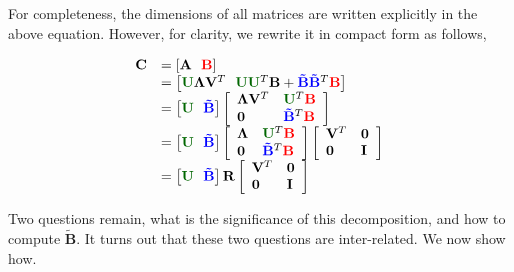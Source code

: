 For completeness, the dimensions of all matrices are written explicitly in the above equation.  However, for clarity, we rewrite it in compact form as follows,

\begin{equation}
\begin{array}{llll}
\mathbf{C} &= \left[{\mathbf{A}} \ \ {\color{red}{\color{red}\mathbf{B}}}\right]\\
&= \left[{\color{darkgreen}\mathbf{U}}\mathbf{\Lambda}\mathbf{V}^T \ \ {\color{darkgreen}\mathbf{U}}{\color{darkgreen}\mathbf{U}}^T\mathbf{B} + {\color{blue}\mathbf{\tilde{B}}} {{\color{blue}\mathbf{\tilde{B}}}^T}{\color{red}{\color{red}\mathbf{B}}}\right]\\
&= \left[{\color{darkgreen}\mathbf{U}} \ \ {\color{blue}\mathbf{\tilde{B}}}\right]\left[\begin{array}{llll}\mathbf{\Lambda}\mathbf{V}^T &{\color{darkgreen}\mathbf{U}}^T{\color{red}{\color{red}\mathbf{B}}}\\ \mathbf{0} & {\color{blue}\mathbf{\tilde{B}}}^T{\color{red}{\color{red}\mathbf{B}}}\end{array}\right]\\
&= \left[{\color{darkgreen}\mathbf{U}} \ \ {\color{blue}\mathbf{\tilde{B}}}\right]\left[\begin{array}{llll}\mathbf{\Lambda} & {\color{darkgreen}\mathbf{U}}^T{\color{red}{\color{red}\mathbf{B}}}\\ \mathbf{0} & {\color{blue}\mathbf{\tilde{B}}}^T{\color{red}{\color{red}\mathbf{B}}}\end{array}\right] \left[\begin{array}{llll}\mathbf{V}^T & \mathbf{0}\\ \mathbf{0} & \mathbf{I}\end{array}\right]\\
&= \left[{\color{darkgreen}\mathbf{U}} \ \ {\color{blue}\mathbf{\tilde{B}}}\right]\mathbf{R} \left[\begin{array}{llll}\mathbf{V}^T & \mathbf{0}\\ \mathbf{0} & \mathbf{I}\end{array}\right]
\end{array}
\label{Eqn:short}
\end{equation}
\normalsize

Two questions remain, what is the significance of this decomposition, and how to compute $\mathbf{\tilde{B}}$.  It turns out that these two questions are inter-related.  We now show how.

